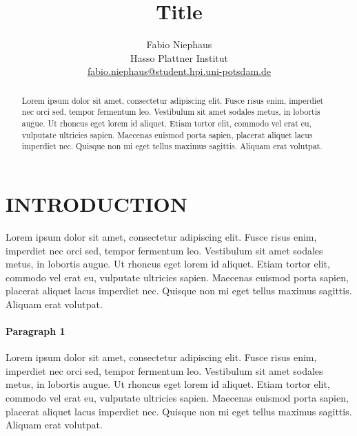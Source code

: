 \documentclass[english,paper=a4,twocolumn=true,DIV=calc,fontsize=9pt]{scrartcl}
\begin{document}
%

\title{Title}

\author{
    Fabio Niephaus\\
    {Hasso Plattner Institut}\\
    \url{fabio.niephaus@student.hpi.uni-potsdam.de}
}

\maketitle
\begin{abstract}
Lorem ipsum dolor sit amet, consectetur adipiscing elit. Fusce risus enim, imperdiet nec orci sed, tempor fermentum leo. Vestibulum sit amet sodales metus, in lobortis augue. Ut rhoncus eget lorem id aliquet. Etiam tortor elit, commodo vel erat eu, vulputate ultricies sapien. Maecenas euismod porta sapien, placerat aliquet lacus imperdiet nec. Quisque non mi eget tellus maximus sagittis. Aliquam erat volutpat.
\end{abstract}




\section{INTRODUCTION}
Lorem ipsum dolor sit amet, consectetur adipiscing elit. Fusce risus enim, imperdiet nec orci sed, tempor fermentum leo. Vestibulum sit amet sodales metus, in lobortis augue. Ut rhoncus eget lorem id aliquet. Etiam tortor elit, commodo vel erat eu, vulputate ultricies sapien. Maecenas euismod porta sapien, placerat aliquet lacus imperdiet nec. Quisque non mi eget tellus maximus sagittis. Aliquam erat volutpat.

\paragraph{Paragraph 1}
Lorem ipsum dolor sit amet, consectetur adipiscing elit. Fusce risus enim, imperdiet nec orci sed, tempor fermentum leo. Vestibulum sit amet sodales metus, in lobortis augue. Ut rhoncus eget lorem id aliquet. Etiam tortor elit, commodo vel erat eu, vulputate ultricies sapien. Maecenas euismod porta sapien, placerat aliquet lacus imperdiet nec. Quisque non mi eget tellus maximus sagittis. Aliquam erat volutpat.
\end{document}
